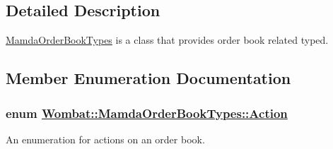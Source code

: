 \subsection{Detailed Description}
\hyperlink{classWombat_1_1MamdaOrderBookTypes}{Mamda\-Order\-Book\-Types} is a class that provides order book related typed. 



\subsection{Member Enumeration Documentation}
\hypertarget{classWombat_1_1MamdaOrderBookTypes_674fcb8aae6f411d51060acc45b6c11e}{
\subsubsection[Action]{\setlength{\rightskip}{0pt plus 5cm}enum \hyperlink{classWombat_1_1MamdaOrderBookTypes_674fcb8aae6f411d51060acc45b6c11e}{Wombat::Mamda\-Order\-Book\-Types::Action}}}
\label{classWombat_1_1MamdaOrderBookTypes_674fcb8aae6f411d51060acc45b6c11e}


An enumeration for actions on an order book. 

